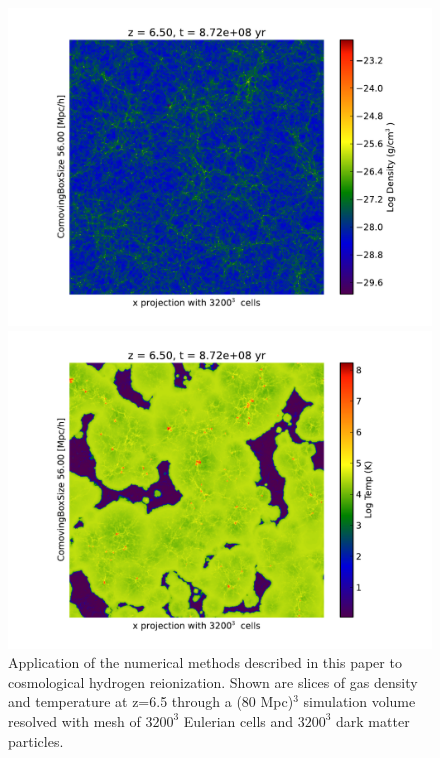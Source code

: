 \begin{figure}[t]
\centerline{\hfill
  \includegraphics[scale=0.75, trim=0.5cm 0.5cm 0.5cm 0.5cm]{slice_Density_x_HD14901.pdf}
  \hfill}
\centerline{\hfill
  \includegraphics[scale=0.75, trim=0.5cm 0.5cm 0.5cm 0.5cm]{slice_Temperature_x_HD14901.pdf}
  \hfill}
  \caption{Application of the numerical methods described in this paper to cosmological hydrogen reionization. Shown are slices of gas density and temperature at z=6.5 through a (80 Mpc)$^3$ simulation volume resolved with mesh of $3200^3$ Eulerian cells and $3200^3$ dark matter particles.}
  \label{fig:simulation}
\end{figure}

